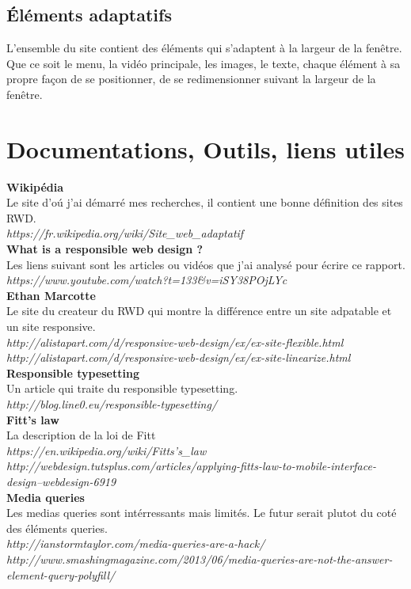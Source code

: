 \documentclass{article}
\begin{document}
\subsection{\'El\'ements adaptatifs}

L'ensemble du site contient des \'el\'ements qui s'adaptent \`a la largeur de la fen\^etre. Que ce soit le menu, la vid\'eo principale, les images, le texte, chaque \'el\'ement \`a sa propre fa\c{c}on de se positionner, de se redimensionner suivant la largeur de la fen\^etre.

\newpage
\section{Documentations, Outils, liens utiles} 

\textbf{Wikip\'edia}\\
Le site d'o\'u j'ai d\'emarr\'e mes recherches, il contient une bonne d\'efinition des sites RWD.\\
\textit{https://fr.wikipedia.org/wiki/Site\_web\_adaptatif}
\vspace{0.5cm}\\
\textbf{What is a responsible web design ?}\\
Les liens suivant sont les articles ou vid\'eos que j'ai analys\'e pour \'ecrire ce rapport.\\
\textit{https://www.youtube.com/watch?t=133\&v=iSY38POjLYc}
\vspace{0.5cm}\\
\textbf{Ethan Marcotte}\\
Le site du createur du RWD qui montre la diff\'erence entre un site adpatable et un site responsive.\\
\textit{http://alistapart.com/d/responsive-web-design/ex/ex-site-flexible.html}\\
\textit{http://alistapart.com/d/responsive-web-design/ex/ex-site-linearize.html}
\vspace{0.5cm}\\
\textbf{Responsible typesetting}\\
Un article qui traite du responsible typesetting.\\
\textit{http://blog.line0.eu/responsible-typesetting/}
\vspace{0.5cm}\\
\textbf{Fitt's law}\\
La description de la loi de Fitt\\
\textit{https://en.wikipedia.org/wiki/Fitts's\_law}\\
\textit{http://webdesign.tutsplus.com/articles/applying-fitts-law-to-mobile-interface-design--webdesign-6919}
\vspace{0.5cm}\\
\textbf{Media queries}\\
Les medias queries sont int\'erressants mais limit\'es. Le futur serait plutot du cot\'e des \'el\'ements queries.\\
\textit{http://ianstormtaylor.com/media-queries-are-a-hack/}\\
\textit{http://www.smashingmagazine.com/2013/06/media-queries-are-not-the-answer-element-query-polyfill/}\\
\end{document}
